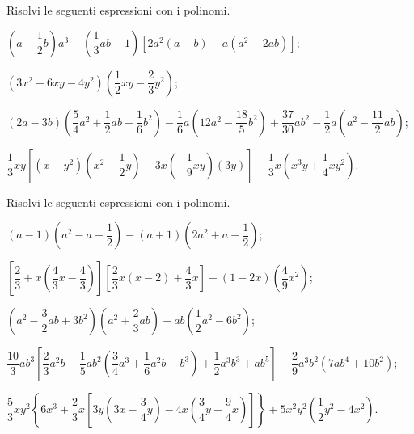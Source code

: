 \begin{esercizio}[\Ast]
\label{ese:11.49}
Risolvi le seguenti espressioni con i polinomi.
 \begin{enumeratea}
 \item $\left(a-\dfrac{1}{2}b\right)a^{3}-\left(\dfrac{1}{3}{ab}-1\right)\left[2a^{2}(a-b)-a\left(a^{2}-2{ab}\right)\right]$;
 \item $\left(3x^2+6xy-4y^2\right)\left(\dfrac{1}{2}xy-\dfrac{2}{3}y^2\right)$;
 \item $(2a-3b)\left(\dfrac{5}{4}a^{2}+\dfrac{1}{2}{ab}-\dfrac{1}{6}b^{2}\right)-\dfrac{1}{6}a\left(12a^{2}-\dfrac{18}{5}b^{2}\right)+\dfrac{37}{30}ab^{2}-\dfrac{1}{2}a\left(a^{2}-\dfrac{11}{2}{ab}\right)$;
 \item $\dfrac{1}{3}xy\left[\left(x-y^{2}\right)\left(x^{2}-\dfrac{1}{2}y\right)-3x\left(-{\dfrac{1}{9}xy}\right)\left(3y\right)\right]-\dfrac{1}{3}x\left(x^{3}y+\dfrac{1}{4}xy^{2}\right)$.
 \end{enumeratea}
\end{esercizio}

\begin{esercizio}[\Ast]
\label{ese:11.50}
Risolvi le seguenti espressioni con i polinomi.
 \begin{enumeratea}
 \item $(a-1)\left(a^{2}-a+\dfrac{1}{2}\right)-(a+1)\left(2a^{2}+a-\dfrac{1}{2}\right)$;
 \item $\left[\dfrac{2}{3}+x\left(\dfrac{4}{3}x-\dfrac{4}{3}\right)\right]\left[\dfrac{2}{3}x(x-2)+\dfrac{4}{3}x\right]-(1-2x)\left(\dfrac{4}{9}x^{2}\right)$;
 \item $\left(a^2-\dfrac{3}{2}ab+3b^2\right)\left(a^2+\dfrac{2}{3}ab\right)-ab\left(\dfrac{1}{2}a^{2}-6b^{2}\right)$;
 \item $\dfrac{10}{3}ab^{3}\left[\dfrac{2}{3}a^{2}b-\dfrac{1}{5}ab^{2}\left(\dfrac{3}{4}a^{3}+\dfrac{1}{6}a^{2}b-b^{3}\right)+\dfrac{1}{2}a^{3}b^{3}+ab^{5}\right]-\dfrac{2}{9}a^{3}b^{2}\left(7ab^{4}+10b^{2}\right)$;
 \item $\dfrac{5}{3}xy^{2}\left\lbrace 6x^{3}+\dfrac{2}{3}x\left[3y\left(3x-\dfrac{3}{4}y\right)-4x\left(\dfrac{3}{4}y-\dfrac{9}{4}x\right)\right]\right\rbrace+5x^{2}y^{2} \left(\dfrac{1}{2}y^{2}-4x^{2}\right)$.
 \end{enumeratea}
\end{esercizio}

